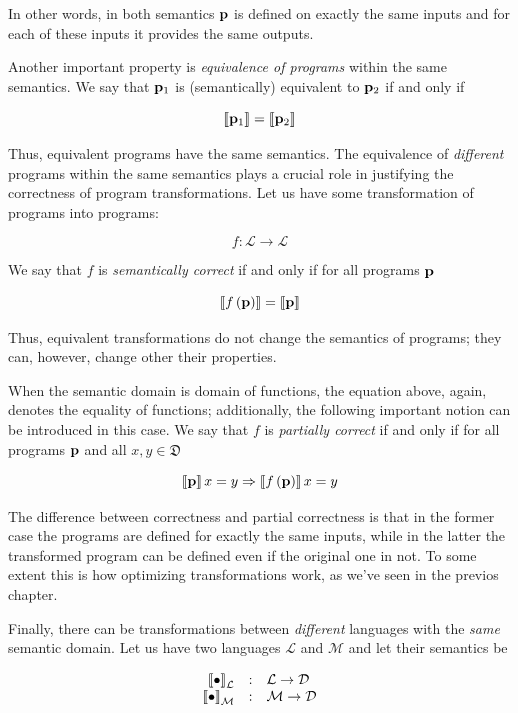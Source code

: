 In other words, in both semantics $\mathbf{p}$ is defined on exactly the same inputs and for each of these inputs it provides the same outputs.

Another important property is \emph{equivalence of programs} within the same semantics. We say that $\mathbf{p}_1$ is (semantically) equivalent to $\mathbf{p}_2$ if
and only if

\[
\llbracket{\mathbf{p}_1}\rrbracket=\llbracket{\mathbf{p}_2}\rrbracket
\]

Thus, equivalent programs have the same semantics. The equivalence of \emph{different} programs within the same semantics plays a crucial
role in justifying the correctness of program transformations. Let us have some transformation of programs into programs:

\[
f : \mathcal{L}\to\mathcal{L}
\]

We say that $f$ is \emph{semantically correct} if and only if for all programs $\mathbf{p}$

\[
\llbracket{f\,(\mathbf{p})}\rrbracket=\llbracket{\mathbf{p}}\rrbracket
\]

Thus, equivalent transformations do not change the semantics of programs; they can, however, change other their properties.

When the semantic domain is domain of functions, the equation above, again, denotes the equality of functions; additionally,
the following important notion can be introduced in this case. We say that $f$ is \emph{partially correct} if and only if
for all programs $\mathbf{p}$ and all $x, y\in\mathfrak{D}$

\[
\llbracket{\mathbf{p}}\rrbracket\,x=y\Rightarrow\llbracket{f\,(\mathbf{p})}\rrbracket\,x=y
\]

The difference between correctness and partial correctness is that in the former case the programs are defined for exactly the same inputs,
while in the latter the transformed program can be defined even if the original one in not. To some extent this is how
optimizing transformations work, as we've seen in the previos chapter.

Finally, there can be transformations between \emph{different} languages with the \emph{same} semantic domain. Let us have two languages $\mathcal{L}$ and $\mathcal{M}$
and let their semantics be

\[
\begin{array}{rcl}
  \sembr{\bullet}^\ph_\mathcal{L} & : & \mathcal{L}\to\mathcal{D}\\
  \sembr{\bullet}^\ph_\mathcal{M} & : & \mathcal{M}\to\mathcal{D}
\end{array}
\]

